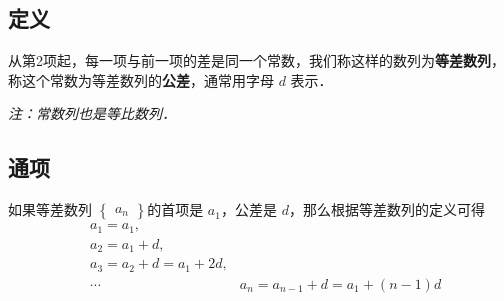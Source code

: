 
\subsection{定义}
从第2项起，每一项与前一项的差是同一个常数，我们称这样的数列为\textbf{等差数列}，称这个常数为等差数列的\textbf{公差}，通常用字母 $d$ 表示．

\textsl{注：常数列也是等比数列．}

\subsection{通项}
如果等差数列 $\begin{Bmatrix} a_n \end{Bmatrix}$的首项是 $a_1$，公差是 $d$，那么根据等差数列的定义可得
\begin{equation}
\begin{aligned}
&a_1 = a_1,\\
&a_2 = a_1 + d,\\
&a_3 = a_2 + d = a_1 + 2d,\\
&\cdots
&a_n = a_{n-1} + d = a_1 + (n - 1)d
\end{aligned}
\end{equation}